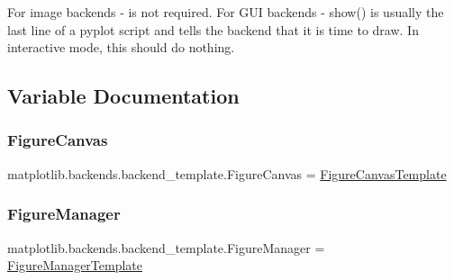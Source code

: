\begin{DoxyVerb}For image backends - is not required.
For GUI backends - show() is usually the last line of a pyplot script and
tells the backend that it is time to draw.  In interactive mode, this
should do nothing.
\end{DoxyVerb}
 

\subsection{Variable Documentation}
\mbox{\label{namespacematplotlib_1_1backends_1_1backend__template_af766f50365e7bb5944cc0b140e3b3200}} 
\subsubsection{\texorpdfstring{Figure\+Canvas}{FigureCanvas}}
{\footnotesize\ttfamily matplotlib.\+backends.\+backend\+\_\+template.\+Figure\+Canvas = \hyperlink{classmatplotlib_1_1backends_1_1backend__template_1_1FigureCanvasTemplate}{Figure\+Canvas\+Template}}

\mbox{\label{namespacematplotlib_1_1backends_1_1backend__template_a44c2f2ee4fb04bd94b280dfaa2f76cec}} 
\subsubsection{\texorpdfstring{Figure\+Manager}{FigureManager}}
{\footnotesize\ttfamily matplotlib.\+backends.\+backend\+\_\+template.\+Figure\+Manager = \hyperlink{classmatplotlib_1_1backends_1_1backend__template_1_1FigureManagerTemplate}{Figure\+Manager\+Template}}

